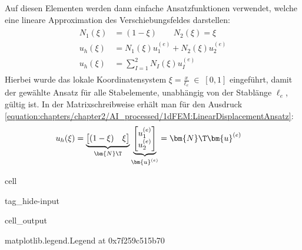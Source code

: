 \documentclass[letterpaper,10pt,german]{jupyterBook}
\begin{document}
\sphinxAtStartPar
Auf diesen Elementen werden dann einfache Ansatzfunktionen verwendet, welche eine lineare Approximation des Verschiebungsfeldes darstellen:
\begin{equation}\label{equation:chapters/chapter2/1dFEM:LinearDisplacementAnsatz}
\begin{split}\begin{align}
 N_1(\xi) & = (1-\xi) \qquad N_2(\xi)= \xi  \\
 u_h(\xi) & = N_1(\xi) u_1^{(e)}+ N_2(\xi) u_2^{(e)} \\
 u_h(\xi) & = \sum_{I=1}^2 N_I(\xi) u_I^{(e)}
 \end{align}\end{split}
\end{equation}
\sphinxAtStartPar
Hierbei wurde das lokale Koordinatensystem \(\xi = \frac{x}{\ell_e} \; \in \; [0,1]\)  eingeführt, damit der gewählte Ansatz für alle Stabelemente, unabhängig von der Stablänge \(\ell_e\), gültig ist. In der Matrixschreibweise erhält man für den Ausdruck \eqref{equation:chapters/chapter2/AI_processed/1dFEM:LinearDisplacementAnsatz}:
\begin{equation}\label{equation:chapters/chapter2/1dFEM:LinearDisplacementAnsatz2}
\begin{split}\begin{align}
  u_h(\xi) & = \underbrace{\begin{bmatrix} (1-\xi) & \xi \end{bmatrix}}_{\bm{N}\T} \underbrace{\begin{bmatrix} u_1^{(e)} \\ u_2^{(e)}\end{bmatrix}}_{\bm{u}^{(e)}} = \bm{N}\T \bm{u}^{(e)}
 \end{align}\end{split}
\end{equation}
\begin{sphinxuseclass}{cell}
\begin{sphinxuseclass}{tag_hide-input}\begin{sphinxVerbatimOutput}

\begin{sphinxuseclass}{cell_output}
\begin{sphinxVerbatim}[commandchars=\\\{\}]
\PYGZlt{}matplotlib.legend.Legend at 0x7f259c515b70\PYGZgt{}
\end{sphinxVerbatim}

\noindent{}

\end{sphinxuseclass}\end{sphinxVerbatimOutput}

\end{sphinxuseclass}
\end{sphinxuseclass}
\end{document}
